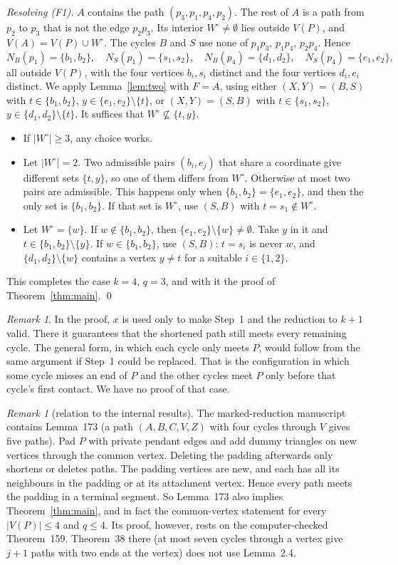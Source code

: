 \documentclass[11pt]{amsart}
\theoremstyle{definition}
\theoremstyle{remark}
\newtheorem{remark}[theorem]{Remark}
\begin{document}
\emph{Resolving (F1).} $A$ contains the path $(p_3,p_1,p_4,p_2)$. The rest of $A$ is a path from $p_2$
to $p_3$ that is not the edge $p_2p_3$. Its interior $W^\circ\ne\emptyset$ lies outside $V(P)$,
and $V(A)=V(P)\cup W^\circ$. The cycles $B$ and $S$ use none of $p_1p_3$, $p_1p_4$, $p_2p_4$. Hence
$$N_B(p_1)=\{b_1,b_2\},\quad N_S(p_1)=\{s_1,s_2\},\quad N_B(p_4)=\{d_1,d_2\},\quad N_S(p_4)=\{e_1,e_2\},$$
all outside $V(P)$, with the four vertices $b_i,s_i$ distinct and the four vertices $d_i,e_i$
distinct. We apply Lemma~\ref{lem:two} with $F=A$, using either
$(X,Y)=(B,S)$ with $t\in\{b_1,b_2\}$, $y\in\{e_1,e_2\}\setminus\{t\}$, or $(X,Y)=(S,B)$ with
$t\in\{s_1,s_2\}$, $y\in\{d_1,d_2\}\setminus\{t\}$. It suffices that $W^\circ\not\subseteq\{t,y\}$.
\begin{itemize}[leftmargin=*]
\item If $|W^\circ|\ge 3$, any choice works.
\item Let $|W^\circ|=2$. Two admissible pairs $(b_i,e_j)$ that share a coordinate give different sets
$\{t,y\}$, so one of them differs from $W^\circ$. Otherwise at most two pairs are admissible. This
happens only when $\{b_1,b_2\}=\{e_1,e_2\}$, and then the only set is $\{b_1,b_2\}$. If that set is
$W^\circ$, use $(S,B)$ with $t=s_1\notin W^\circ$.
\item Let $W^\circ=\{w\}$. If $w\notin\{b_1,b_2\}$, then $\{e_1,e_2\}\setminus\{w\}\ne\emptyset$.
Take $y$ in it and $t\in\{b_1,b_2\}\setminus\{y\}$. If $w\in\{b_1,b_2\}$, use $(S,B)$: $t=s_i$ is
never $w$, and $\{d_1,d_2\}\setminus\{w\}$ contains a vertex $y\ne t$ for a suitable
$i\in\{1,2\}$.
\end{itemize}
This completes the case $k=4$, $q=3$, and with it the proof of Theorem~\ref{thm:main}. \qed

\begin{remark}
In the proof, $x$ is used only to make Step~1 and the reduction to $k+1$ valid. There it guarantees
that the shortened path still meets every remaining cycle. The general form, in which each cycle
only meets $P$, would follow from the same argument if Step~1 could be replaced. That is the
configuration in which some cycle misses an end of $P$ and the other cycles meet $P$ only before
that cycle's first contact. We have no proof of that case.
\end{remark}

\begin{remark}[relation to the internal results]
The marked-reduction manuscript contains Lemma~173 (a path $(A,B,C,V,Z)$ with four cycles through
$V$ gives five paths). Pad $P$ with private pendant edges and add dummy triangles on new vertices through the common
vertex. Deleting the padding afterwards only shortens or deletes paths. The padding vertices are new,
and each has all its neighbours in the padding or at its attachment vertex. Hence every path meets
the padding in a terminal segment. So Lemma~173 also implies Theorem~\ref{thm:main}, and in fact the
common-vertex statement for every $|V(P)|\le 4$ and $q\le 4$. Its proof, however,
rests on the computer-checked Theorem~159. Theorem~38 there (at most seven cycles through a
vertex give $j+1$ paths with two ends at the vertex) does not use Lemma~2.4.
\end{remark}
\end{document}
